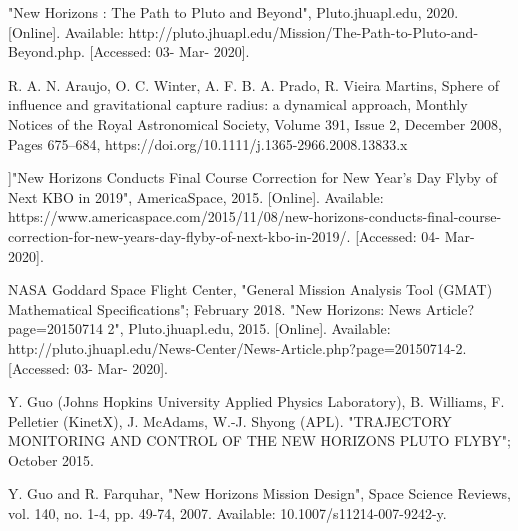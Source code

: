 \documentclass[11pt]{article}
\begin{document}
\begin{thebibliography}{}
"New Horizons : The Path to Pluto and Beyond", Pluto.jhuapl.edu, 2020. [Online]. Available: http://pluto.jhuapl.edu/Mission/The-Path-to-Pluto-and-Beyond.php. [Accessed: 03- Mar- 2020].

R. A. N. Araujo, O. C. Winter, A. F. B. A. Prado, R. Vieira Martins, Sphere of influence and gravitational capture radius: a dynamical approach, Monthly Notices of the Royal Astronomical Society, Volume 391, Issue 2, December 2008, Pages 675–684, https://doi.org/10.1111/j.1365-2966.2008.13833.x

]"New Horizons Conducts Final Course Correction for New Year’s Day Flyby of Next KBO in 2019", AmericaSpace, 2015. [Online]. Available: https://www.americaspace.com/2015/11/08/new-horizons-conducts-final-course-correction-for-new-years-day-flyby-of-next-kbo-in-2019/. [Accessed: 04- Mar- 2020].

NASA Goddard Space Flight Center, "General Mission Analysis Tool (GMAT) Mathematical Specifications"; February 2018.
"New Horizons: News Article?page=20150714 2", Pluto.jhuapl.edu, 2015. [Online]. Available: http://pluto.jhuapl.edu/News-Center/News-Article.php?page=20150714-2. [Accessed: 03- Mar- 2020].

Y. Guo (Johns Hopkins University Applied Physics Laboratory), B. Williams, F. Pelletier (KinetX), J. McAdams, W.-J. Shyong (APL). "TRAJECTORY MONITORING AND CONTROL OF THE NEW HORIZONS PLUTO FLYBY"; October 2015.

Y. Guo and R. Farquhar, "New Horizons Mission Design", Space Science Reviews, vol. 140, no. 1-4, pp. 49-74, 2007. Available: 10.1007/s11214-007-9242-y.

\end{thebibliography}{}
\appendix
\renewcommand\thefigure{A.\arabic{figure}}  
\setcounter{figure}{0}
\end{document}
